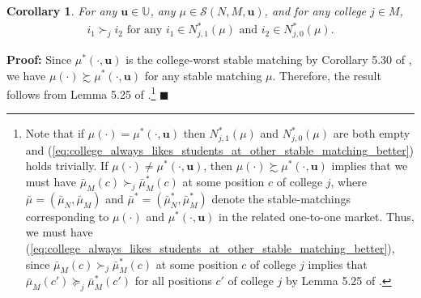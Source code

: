 \documentclass[12pt, fullpage]{amsart}
\newtheorem{corollary}{Corollary}[section]
\theoremstyle{definition}
\theoremstyle{definition}
\theoremstyle{definition}
\begin{document}
\begin{bibunit}[econometrica]
\begin{corollary}\label{other_stable_matching_always_Better}
For any $\boldsymbol{u}\in \mathbb{U}$, any $\mu \in \mathcal{S}(N,M,\boldsymbol{u})$, and for any college $j\in M$,
	\begin{align}\label{eq:college_always_likes_students_at_other_stable_matching_better}
		i_{1}\succ_{j} i_{2} \text{ for any }i_{1}\in N^{*}_{j,1}(\mu) \text{ and }i_{2}\in N^{*}_{j,0}(\mu).
	\end{align}
\end{corollary}

\noindent \textbf{Proof:} Since $\mu^{*}(\cdot,\boldsymbol{u})$ is the college-worst stable
matching by Corollary 5.30 of \cite{Roth/Sotomayor:90:TwoSidedMatching}, we have $\mu(\cdot)\succsim\mu^{*}(\cdot,\boldsymbol{u})$ for any stable matching $\mu$. 
Therefore, the result follows from Lemma 5.25 of \cite{Roth/Sotomayor:90:TwoSidedMatching}.\footnote{Note that if $\mu(\cdot)=\mu^{*}(\cdot,\boldsymbol{u})$ then  $N^{*}_{j,1}(\mu) $ and $N^{*}_{j,0}(\mu) $ are both empty and  (\ref{eq:college_always_likes_students_at_other_stable_matching_better}) holds trivially. If $\mu(\cdot)\ne \mu^{*}(\cdot,\boldsymbol{u})$, then $\mu(\cdot)\succsim\mu^{*}(\cdot,\boldsymbol{u})$ implies that we must have $\bar{\mu}_{M}(c)\succ_{j}\bar{\mu}^{*}_{M}(c)$ at some position $c$ of college $j$, where $\bar{\mu}=(\bar{\mu}_{N},\bar{\mu}_{M})$ and $\bar{\mu}^{*}=(\bar{\mu}_{N}^{*},\bar{\mu}_{M}^{*})$ denote the stable-matchings corresponding to $\mu(\cdot)$ and $\mu^{*}(\cdot,\boldsymbol{u})$ in the related one-to-one market. Thus, we must have  (\ref{eq:college_always_likes_students_at_other_stable_matching_better}), since $\bar{\mu}_{M}(c)\succ_{j}\bar{\mu}^{*}_{M}(c)$ at some position $c$ of college $j$ implies that $\bar{\mu}_{M}(c')\succeq_{j}\bar{\mu}^{*}_{M}(c')$ for all positions $c'$ of college $j$ by Lemma 5.25 of \cite{Roth/Sotomayor:90:TwoSidedMatching}.} $\blacksquare$\medskip 


\end{bibunit}
\end{document}

